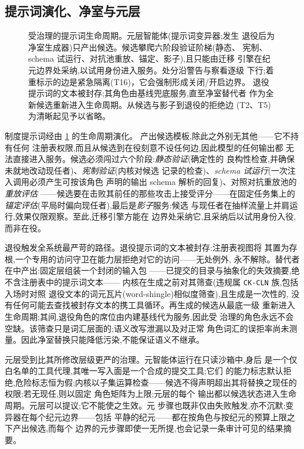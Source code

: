 \subsection{提示词演化、净室与元层}\label{sec:rqgm:prompts}

\begin{figure}[t]
  \centering
  \resizebox{\columnwidth}{!}{}
  \caption{受治理的提示词生命周期。元层智能体(提示词变异器;发生
    退役后为净室生成器)只产出候选。候选攀爬六阶段验证阶梯(静态、
    宪制、schema 试运行、对抗池重放、锚定、影子),且只能由迁移
    引擎在纪元边界处采纳,以试用身份进入服务。处分沿警告与察看逐级
    下行;着重标示的边是紧急隔离(T16)，它会强制形成关闭/开启边界。
    退役提示词的文本被封存;其角色由基线兜底服务,直至净室替代者
    作为全新候选重新进入生命周期。从候选与影子到退役的拒绝边
    (T2、T5)为清晰起见予以省略。}
  \label{fig:prompt-lifecycle}
\end{figure}

制度提示词经由 \cref{fig:prompt-lifecycle} 的生命周期演化。
产出候选模板,除此之外别无其他——它不持有任何
注册表权限,而且从候选到在役刻意不设任何边,因此模型的任何输出都
无法直接进入服务。候选必须闯过六个阶段:\emph{静态验证}(确定性的
良构性检查,并确保未就地改动现任者)、\emph{宪制验证}(内核对候选
记录的检查)、\emph{schema 试运行}(一次注入调用必须产生可按该角色
声明的输出 schema 解析的回复)、对照对抗重放池的\emph{重放评估}
——候选要在击败其前任的那些攻击上接受评分——在固定任务集上的
\emph{锚定评估}(平局时偏向现任者),最后是\emph{影子}服务:候选
与现任者在抽样流量上并肩运行,效果仅限观察。至此,迁移引擎方能在
边界处采纳它,且采纳后以试用身份入役,而非在役。

退役触发全系统最严苛的路径。退役提示词的文本被封存:注册表视图将
其置为存根,一个专用的访问守卫在能力层拒绝对它的访问——无处例外,
永不解除。替代者在中产出:固定层组装一个封闭的输入包
——已提交的目录与抽象化的失效摘要,绝不含注册表中的提示词文本——
内核在生成之前对其筛查(违规属 \texttt{CK-CLN} 族,包括入场时对照
退役文本的词元瓦片(word-shingle)相似度筛查),且生成是一次性的,
没有任何可能去查找被封存文本的携工具循环。再生成的候选从最底一级
重新进入生命周期;其间,退役角色的席位由内建基线代为服务,因此受
治理的角色永远不会空缺。该筛查只是词汇层面的;语义改写泄漏以及对正常
角色词汇的误拒率尚未测量。因此净室替换只能降低污染,不能保证语义不继承。

元层受到比其所修改层级更严的治理。元智能体运行在只读沙箱中,身后
是一个仅白名单的工具代理,其唯一写入面是一个合成的提交工具;它们
的能力标志默认拒绝,危险标志恒为假;内核以子集运算检查——候选不得声明超出其将替换之现任的权限;若无现任,则以固定
角色矩阵为上限;元层的每个
输出都以候选状态进入生命周期。元层可以提议;它不能使之生效。元
步骤也既非仅由失败触发,亦不沉默:变异器在每个纪元边界——包括
平静的纪元——都在按角色与按纪元的预算上限之下产出候选,而每个
边界的元步骤即使一无所提,也会记录一条审计可见的结果摘要。

